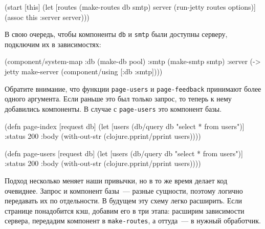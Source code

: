 \begin{english}
  \begin{clojure}
(start [this]
  (let [routes (make-routes db smtp)
        server (run-jetty routes options)]
    (assoc this :server server)))
  \end{clojure}
\end{english}

\fi

В свою очередь, чтобы компоненты \verb|db| и \verb|smtp| были доступны серверу,
подключим их в зависимостях:

\begin{english}
  \begin{clojure}
(component/system-map
 :db   (make-db pool)
 :smtp (make-smtp smtp)
 :server
 (-> jetty
     make-server
     (component/using [:db :smtp])))
  \end{clojure}
\end{english}

Обратите внимание, что функции \verb|page-users| и \verb|page-feedback|
принимают более одного аргумента. Если раньше это был только запрос, то теперь к
нему добавились компоненты. В случае с \verb|page-users| это компонент базы.

\ifnarrow

\begin{english}
  \begin{clojure}
(defn page-index
  [request db]
  (let [users (db/query db
                "select * from users")]
    {:status 200
     :body (with-out-str
             (clojure.pprint/pprint
               users))}))
  \end{clojure}
\end{english}

\else

\begin{english}
  \begin{clojure}
(defn page-users
  [request db]
  (let [users (db/query db "select * from users")]
    {:status 200
     :body (with-out-str
             (clojure.pprint/pprint users))}))
  \end{clojure}
\end{english}

\fi

Подход несколько меняет наши привычки, но в то же время делает код
очевиднее. Запрос и компонент базы~--- разные сущности, поэтому логично
передавать их по отдельности. В будущем эту схему легко расширить. Если странице
понадобится кэш, добавим его в три этапа: расширим зависимости сервера,
передадим компонент в \verb|make-routes|, а оттуда~--- в нужный обработчик.


